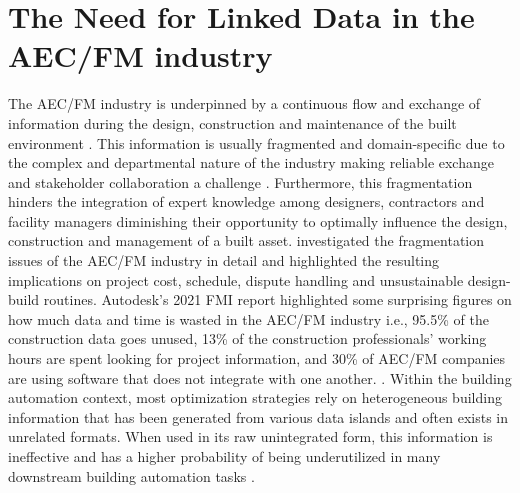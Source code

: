 \section{The Need for Linked Data in the \ac{AEC/FM} industry}
The \ac{AEC/FM} industry is underpinned by a continuous flow and exchange of information during the design, construction and maintenance of the built environment \citep{Borrmann2010}. This information is usually fragmented and domain-specific due to the complex and departmental nature of the industry making reliable exchange and stakeholder collaboration a challenge \citep{Pauwels}. Furthermore, this fragmentation hinders the integration of expert knowledge among designers, contractors and facility managers diminishing their opportunity to optimally influence the design, construction and management of a built asset. \cite{MohdNawi2014} investigated the fragmentation issues of the \ac{AEC/FM} industry in detail and highlighted the resulting implications on project cost, schedule, dispute handling and unsustainable design-build routines. Autodesk's 2021 FMI report highlighted some surprising figures on how much data and time is wasted in the \ac{AEC/FM} industry i.e., 95.5\% of the construction data goes unused, 13\% of the construction professionals' working hours are spent looking for project information, and  30\% of \ac{AEC/FM} companies are using software that does not integrate with one another. \citep{Autodesk2021HarnessingConstruction}. Within the building automation context, most optimization strategies rely on heterogeneous building information that has been generated from various data islands and often exists in unrelated formats. When used in its raw unintegrated form, this information is ineffective and has a higher probability of being underutilized in many downstream building automation
tasks \citep{Borrmann2010,Pauwels}.  

